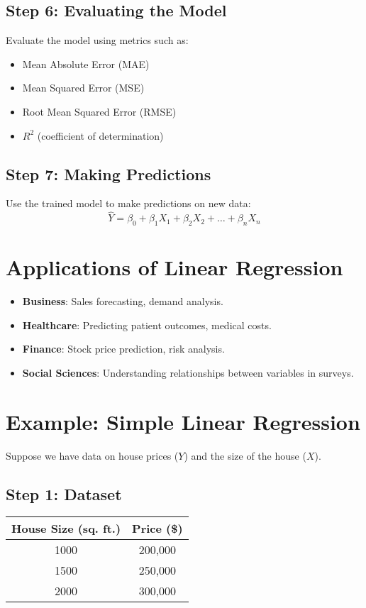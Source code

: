 \documentclass[a4paper,12pt]{article}
\begin{document}
\subsection{Step 6: Evaluating the Model}
Evaluate the model using metrics such as:
\begin{itemize}
    \item Mean Absolute Error (MAE)
    \item Mean Squared Error (MSE)
    \item Root Mean Squared Error (RMSE)
    \item $R^2$ (coefficient of determination)
\end{itemize}

\subsection{Step 7: Making Predictions}
Use the trained model to make predictions on new data:
\[
\hat{Y} = \beta_0 + \beta_1 X_1 + \beta_2 X_2 + \ldots + \beta_n X_n
\]

\section{Applications of Linear Regression}
\begin{itemize}
    \item \textbf{Business}: Sales forecasting, demand analysis.
    \item \textbf{Healthcare}: Predicting patient outcomes, medical costs.
    \item \textbf{Finance}: Stock price prediction, risk analysis.
    \item \textbf{Social Sciences}: Understanding relationships between variables in surveys.
\end{itemize}

\section{Example: Simple Linear Regression}
Suppose we have data on house prices ($Y$) and the size of the house ($X$).
\subsection{Step 1: Dataset}
\begin{tabular}{|c|c|}
\hline
House Size (sq. ft.) & Price (\$) \\
\hline
1000 & 200,000 \\
1500 & 250,000 \\
2000 & 300,000 \\
\hline
\end{tabular}
\end{document}
